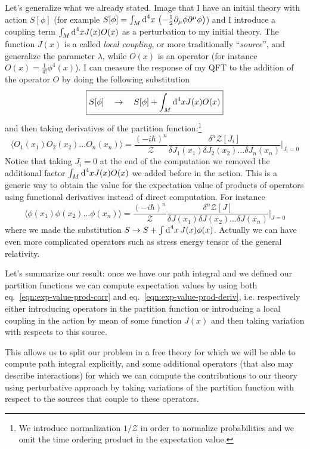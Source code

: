 \documentclass[../main/main.tex]{subfiles}
\begin{document}
Let's generalize what we already stated. Image that I have an initial theory with action $S[\phi]$ (for example $S[\phi]=\int_M\textup{d}^4x\,\left(-\frac12\partial_\mu\phi\partial^\mu\phi\right)$) and I introduce a coupling term $\int_M\textup{d}^4xJ(x)O(x)$ as a perturbation to my initial theory. The function $J(x)$ is a called \emph{local coupling}, or more traditionally ``\emph{source}'', and generalize the parameter $\lambda$, while $O(x)$ is an operator (for instance $O(x)=\frac1{4!}\phi^4(x)$). I can measure the response of my QFT to the addition of the operator $O$ by doing the following substitution
\begin{equation}\boxed{
S[\phi]\quad\to\quad S[\phi]+\int_M\textup{d}^4xJ(x)O(x)
}\end{equation}
and then taking derivatives of the partition function:\footnote{We introduce normalization $1/\mathcal Z$ in order to normalize probabilities and we omit the time ordering product in the expectation value.}
\begin{equation}\label{eqn:exp-value-prod-deriv}\boxed{
\langle O_1(x_1)O_2(x_2)\dots O_n(x_n)\rangle=\frac{(-i\hbar)^n}{\mathcal Z}\frac{\delta^n\mathcal Z[J_i]}{\delta J_1(x_1)\delta J_2(x_2)\dots \delta J_n(x_n)}\bigg\vert_{J_i=0}
}\end{equation}
Notice that taking $J_i=0$ at the end of the computation we removed the additional factor $\int_M\textup{d}^4xJ(x)O(x)$ we added before in the action. 
This is a generic way to obtain the value for the expectation value of products of operators using functional derivatives instead of direct computation. For instance
\[\langle\phi(x_1)\phi(x_2)\dots\phi(x_n)\rangle=\frac{(-i\hbar)^n}{\mathcal Z}\frac{\delta^n\mathcal Z[J]}{\delta J(x_1)\delta J(x_2)\dots \delta J(x_n)}\bigg\vert_{J=0}\]
where we made the substitution
$S\to S+\int\textup{d}^4x \,J(x)\phi(x)$.
Actually we can have even more complicated operators such as stress energy tensor of the general relativity. 

Let's summarize our result: once we have our path integral and we defined our partition functions we can compute expectation values by using both eq.~\eqref{eqn:exp-value-prod-corr} and eq.~\eqref{eqn:exp-value-prod-deriv}, i.e. respectively either introducing operators in the partition function or introducing a local coupling in the action by mean of some function $J(x)$ and then taking variation with respects to this source.  

This allows us to split our problem in a free theory for which we will be able to compute path integral explicitly, and some additional operators (that also may describe interactions) for which we can compute the contributions to our theory using perturbative approach by taking variations of the partition function with respect to the sources that couple to these operators. 
\end{document}
